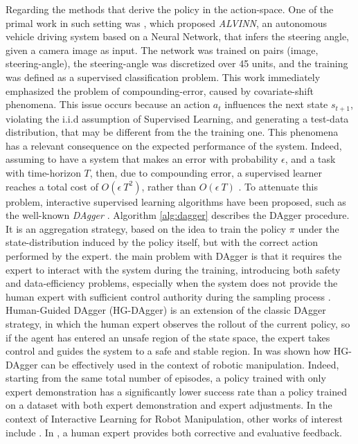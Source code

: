\newline Regarding the methods that derive the policy in the action-space. One of the primal work in such setting was \cite{pomerleau1988alvinn}, which proposed \textit{ALVINN}, an autonomous vehicle driving system based on a Neural Network, that infers the steering angle, given a camera image as input. The network was trained on pairs (image, steering-angle), the steering-angle was discretized over 45 units, and the training was defined as a supervised classification problem. This work immediately emphasized the problem of compounding-error, caused by covariate-shift phenomena. This issue occurs because an action $a_{t}$ influences the next state $s_{t+1}$, violating the i.i.d assumption of Supervised Learning, and generating a test-data distribution, that may be different from the the training one. This phenomena has a relevant consequence on the expected performance of the system. Indeed, assuming to have a system that makes an error with probability $\epsilon$, and a task with time-horizon $T$, then, due to compounding error, a supervised learner reaches a total cost of $O(\epsilon \ T^{2})$, rather than $O(\epsilon \ T)$ \cite{ross2010efficient_reductions,ross2011dagger}. To attenuate this problem, interactive supervised learning algorithms have been proposed, such as the well-known \textit{DAgger} \cite{ross2011dagger}. Algorithm \ref{alg:dagger} describes the DAgger procedure. It is an aggregation strategy, based on the idea to train the policy $\pi$ under the state-distribution induced by the policy itself, but with the correct action performed by the expert. the main problem with DAgger is that it requires the expert to interact with the system during the training, introducing both safety and data-efficiency problems, especially when the system does not provide the human expert with sufficient control authority during the sampling process \cite{laskey2017comparing_hc_rc}. 
\newline Human-Guided DAgger (HG-DAgger) \cite{kelly2019hg_dagger} is an extension of the classic DAgger strategy, in which the human expert observes the rollout of the current policy, so if the agent has entered an unsafe region of the state space, the expert takes control and guides the system to a safe and stable region. In \cite{jang2022bc_z} was shown how HG-DAgger can be effectively used in the context of robotic manipulation. Indeed, starting from the same total number of episodes, a policy trained with only expert demonstration has a significantly lower success rate than a policy trained on a dataset with both expert demonstration and expert adjustments. In the context of Interactive Learning for Robot Manipulation, other works of interest include \cite{mandlekar2020human_in_the_loop,chisari2022correct}. In \cite{chisari2022correct}, a human expert provides both corrective and evaluative feedback. %
